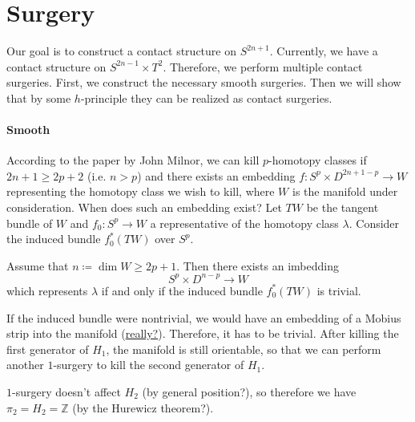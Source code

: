 \section*{Surgery}
Our goal is to construct a contact structure on $S^{2n+1}$. 
Currently, we have a contact structure on $S^{2n-1} \times T^2$.
Therefore, we perform multiple contact surgeries.
First, we construct the necessary smooth surgeries. 
Then we will show that by some $h$-principle they can be realized as contact surgeries.

\paragraph*{Smooth}
According to the paper by John Milnor, we can kill $p$-homotopy classes
if $2n + 1 \geq 2p + 2$  (i.e. $n > p$) and there exists an embedding $f: S^p \times D^{2n+1-p} \to W$ 
representing the homotopy class we wish to kill, where $W$ is the manifold under consideration.
When does such an embedding exist?
Let $TW$ be the tangent bundle of $W$ and $f_0\colon S^p \to W$ a representative of the homotopy class $\lambda$. Consider the induced bundle $f_0^*(TW)$ over $S^p$.
\begin{lemma} %
    Assume that $n \coloneqq \dim W \geq 2p+1$. Then there exists an imbedding
    \[
        S^p \times D^{n-p} \to W
    \]
    which represents $\lambda$ if and only if the induced bundle $f_0^*(TW)$ is trivial.
\end{lemma}

If the induced bundle were nontrivial, we would have an embedding of a Mobius strip into the manifold (\underline{really?}).
Therefore, it has to be trivial. After killing the first generator of $H_1$,
the manifold is still orientable, so that we can perform another $1$-surgery
to kill the second generator of $H_1$.

$1$-surgery doesn't affect $H_2$ (by general position?), so therefore we
have $\pi_2 = H_2 = \mathbb Z$ (by the Hurewicz theorem?).




